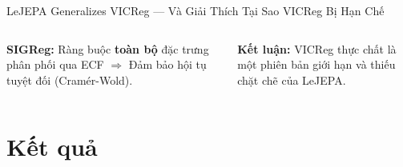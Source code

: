 \documentclass[aspectratio=169,9pt]{beamer}
\begin{document}
\begin{frame}{LeJEPA Generalizes VICReg — Và Giải Thích Tại Sao VICReg Bị Hạn Chế}
\begin{columns}[T]
\vspace{0.6em}
\begin{goodbox}
\footnotesize \textbf{SIGReg:} Ràng buộc \textbf{toàn bộ} đặc trưng phân phối qua ECF $\Rightarrow$ Đảm bảo hội tụ tuyệt đối (Cramér-Wold).
\end{goodbox}

\vspace{0.6em}
\begin{accentbox}
\footnotesize \textbf{Kết luận:} VICReg thực chất là một phiên bản giới hạn và thiếu chặt chẽ của LeJEPA.
\end{accentbox}

\end{columns}
\end{frame}


\section{Kết quả}





\end{document}
